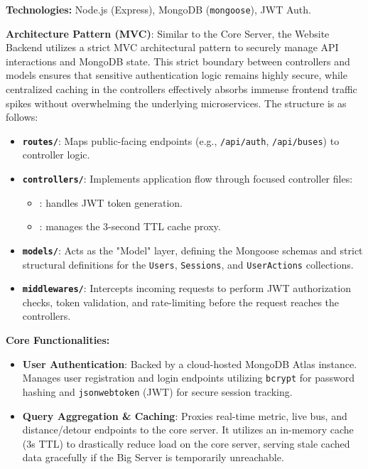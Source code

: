 \documentclass[a4paper]{article}
\begin{document}
\textbf{Technologies:} Node.js (Express), MongoDB (\texttt{mongoose}), JWT Auth.
\medskip

\textbf{Architecture Pattern (MVC)}: Similar to the Core Server, the Website Backend utilizes a strict MVC architectural pattern to securely manage API interactions and MongoDB state. This strict boundary between controllers and models ensures that sensitive authentication logic remains highly secure, while centralized caching in the controllers effectively absorbs immense frontend traffic spikes without overwhelming the underlying microservices. The structure is as follows:
\begin{itemize}
    \item \textbf{\texttt{routes/}}: Maps public-facing endpoints (e.g., \texttt{/api/auth}, \texttt{/api/buses}) to controller logic.
    \item \textbf{\texttt{controllers/}}: Implements application flow through focused controller files:
    \begin{itemize}
        \item {}: handles JWT token generation.
        \item {}: manages the 3-second TTL cache proxy.
    \end{itemize}
    \item \textbf{\texttt{models/}}: Acts as the "Model" layer, defining the Mongoose schemas and strict structural definitions for the \texttt{Users}, \texttt{Sessions}, and \texttt{UserActions} collections.
    \item \textbf{\texttt{middlewares/}}: Intercepts incoming requests to perform JWT authorization checks, token validation, and rate-limiting before the request reaches the controllers.
\end{itemize}
\medskip

\textbf{Core Functionalities:}
\begin{itemize}
    \item \textbf{User Authentication}: Backed by a cloud-hosted MongoDB Atlas instance. Manages user registration and login endpoints utilizing \texttt{bcrypt} for password hashing and \texttt{jsonwebtoken} (JWT) for secure session tracking.
    \item \textbf{Query Aggregation \& Caching}: Proxies real-time metric, live bus, and distance/detour endpoints to the core server. It utilizes an in-memory cache (3s TTL) to drastically reduce load on the core server, serving stale cached data gracefully if the Big Server is temporarily unreachable.
\end{itemize}
\end{document}
